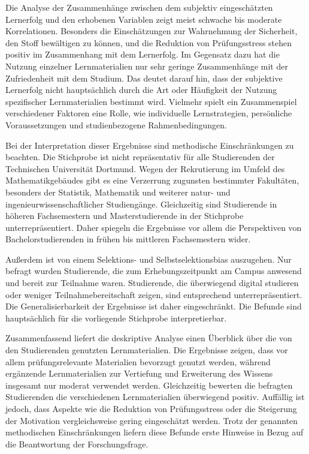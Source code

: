 \documentclass[a4paper,12pt]{article}
\begin{document}
Die Analyse der Zusammenhänge zwischen dem subjektiv eingeschätzten Lernerfolg und den erhobenen Variablen zeigt meist schwache bis moderate Korrelationen. Besonders die Einschätzungen zur Wahrnehmung der Sicherheit, den Stoff bewältigen zu können, und die Reduktion von Prüfungsstress stehen positiv im Zusammenhang mit dem Lernerfolg. Im Gegensatz dazu hat die Nutzung einzelner Lernmaterialien nur sehr geringe Zusammenhänge mit der Zufriedenheit mit dem Studium. Das deutet darauf hin, dass der subjektive Lernerfolg nicht hauptsächlich durch die Art oder Häufigkeit der Nutzung spezifischer Lernmaterialien bestimmt wird. Vielmehr spielt ein Zusammenspiel verschiedener Faktoren eine Rolle, wie individuelle Lernstrategien, persönliche Voraussetzungen und studienbezogene Rahmenbedingungen.

Bei der Interpretation dieser Ergebnisse sind methodische Einschränkungen zu beachten. Die Stichprobe ist nicht repräsentativ für alle Studierenden der Technischen Universität Dortmund. Wegen der Rekrutierung im Umfeld des Mathematikgebäudes gibt es eine Verzerrung zugunsten bestimmter Fakultäten, besonders der Statistik, Mathematik und weiterer natur- und ingenieurwissenschaftlicher Studiengänge. Gleichzeitig sind Studierende in höheren Fachsemestern und Masterstudierende in der Stichprobe unterrepräsentiert. Daher spiegeln die Ergebnisse vor allem die Perspektiven von Bachelorstudierenden in frühen bis mittleren Fachsemestern wider.

Außerdem ist von einem Selektions- und Selbstselektionsbias auszugehen. Nur befragt wurden Studierende, die zum Erhebungszeitpunkt am Campus anwesend und bereit zur Teilnahme waren. Studierende, die überwiegend digital studieren oder weniger Teilnahmebereitschaft zeigen, sind entsprechend unterrepräsentiert. Die Generalisierbarkeit der Ergebnisse ist daher eingeschränkt. Die Befunde sind hauptsächlich für die vorliegende Stichprobe interpretierbar.

Zusammenfassend liefert die deskriptive Analyse einen Überblick über die von den Studierenden genutzten Lernmaterialien. Die Ergebnisse zeigen, dass vor allem prüfungsrelevante Materialien bevorzugt genutzt werden, während ergänzende Lernmaterialien zur Vertiefung und Erweiterung des Wissens insgesamt nur moderat verwendet werden. Gleichzeitig bewerten die befragten Studierenden die verschiedenen Lernmaterialien überwiegend positiv. Auffällig ist jedoch, dass Aspekte wie die Reduktion von Prüfungsstress oder die Steigerung der Motivation vergleichsweise gering eingeschätzt werden. Trotz der genannten methodischen Einschränkungen liefern diese Befunde erste Hinweise in Bezug auf die Beantwortung der Forschungsfrage.
\end{document}
